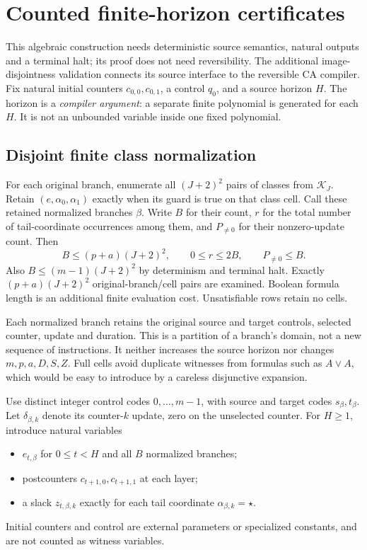 \section{Counted finite-horizon certificates}\label{sec:certificates}
This algebraic construction needs deterministic source semantics, natural
outputs and a terminal halt; its proof does not need reversibility. The
additional image-disjointness validation connects its source interface to the
reversible CA compiler. Fix natural initial counters $c_{0,0},c_{0,1}$, a
control $q_0$, and a source horizon $H$. The horizon is a \emph{compiler
argument}: a separate finite polynomial is generated for each $H$. It is not
an unbounded variable inside one fixed polynomial.

\subsection{Disjoint finite class normalization}
For each original branch, enumerate all $(J+2)^2$ pairs of classes from
$\mathcal K_J$. Retain $(e,\alpha_0,\alpha_1)$ exactly when its guard is true
on that class cell. Call these retained normalized branches $\beta$. Write
$B$ for their count, $r$ for the total number of tail-coordinate occurrences
among them, and $P_{\ne0}$ for their nonzero-update count. Then
\[
 B\le(p+a)(J+2)^2,\qquad 0\le r\le2B,\qquad P_{\ne0}\le B.
                                                               \tag{21}
\]
Also $B\le(m-1)(J+2)^2$ by determinism and terminal halt. Exactly
$(p+a)(J+2)^2$ original-branch/cell pairs are examined. Boolean formula
length is an additional finite evaluation cost. Unsatisfiable rows retain no
cells.

Each normalized branch retains the original source and target controls,
selected counter, update and duration. This is a partition of a branch's
domain, not a new sequence of instructions. It neither increases the source
horizon nor changes $m,p,a,D,S,Z$. Full cells avoid duplicate witnesses from
formulas such as $A\lor A$, which would be easy to introduce by a careless
disjunctive expansion.

Use distinct integer control codes $0,\ldots,m-1$, with source and target
codes $s_\beta,t_\beta$. Let $\delta_{\beta,k}$ denote its counter-$k$ update,
zero on the unselected counter. For $H\ge1$, introduce natural variables
\begin{itemize}
\item $e_{t,\beta}$ for $0\le t<H$ and all $B$ normalized branches;
\item postcounters $c_{t+1,0},c_{t+1,1}$ at each layer;
\item a slack $z_{t,\beta,k}$ exactly for each tail coordinate
$\alpha_{\beta,k}=\star$.
\end{itemize}
Initial counters and control are external parameters or specialized constants,
and are not counted as witness variables.


